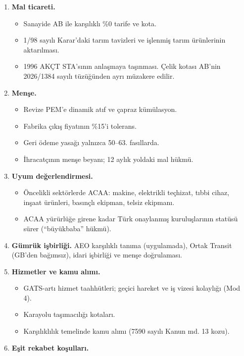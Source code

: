 \begin{enumerate}
\def\labelenumi{\arabic{enumi}.}
\tightlist
\item
  \textbf{Mal ticareti.}

  \begin{itemize}
  \tightlist
  \item
    Sanayide AB ile karşılıklı \%0 tarife ve kota.
  \item
    1/98 sayılı Karar'daki tarım tavizleri ve işlenmiş tarım ürünlerinin aktarılması.
  \item
    1996 AKÇT STA'sının anlaşmaya taşınması. Çelik kotası AB'nin 2026/1384 sayılı tüzüğünden ayrı müzakere edilir.
  \end{itemize}
\item
  \textbf{Menşe.}

  \begin{itemize}
  \tightlist
  \item
    Revize PEM'e dinamik atıf ve çapraz kümülasyon.
  \item
    Fabrika çıkış fiyatının \%15'i tolerans.
  \item
    Geri ödeme yasağı yalnızca 50--63. fasıllarda.
  \item
    İhracatçının menşe beyanı; 12 aylık yoldaki mal hükmü.
  \end{itemize}
\item
  \textbf{Uyum değerlendirmesi.}

  \begin{itemize}
  \tightlist
  \item
    Öncelikli sektörlerde ACAA: makine, elektrikli teçhizat, tıbbi cihaz, inşaat ürünleri, basınçlı ekipman, telsiz ekipmanı.
  \item
    ACAA yürürlüğe girene kadar Türk onaylanmış kuruluşlarının statüsü sürer (``büyükbaba'' hükmü).
  \end{itemize}
\item
  \textbf{Gümrük işbirliği.} AEO karşılıklı tanıma (uygulamada), Ortak Transit (GB'den bağımsız), idari işbirliği ve menşe doğrulaması.
\item
  \textbf{Hizmetler ve kamu alımı.}

  \begin{itemize}
  \tightlist
  \item
    GATS-artı hizmet taahhütleri; geçici hareket ve iş vizesi kolaylığı (Mod 4).
  \item
    Karayolu taşımacılığı kotaları.
  \item
    Karşılıklılık temelinde kamu alımı (7590 sayılı Kanun md. 13 kozu).
  \end{itemize}
\item
  \textbf{Eşit rekabet koşulları.}


\end{enumerate}
